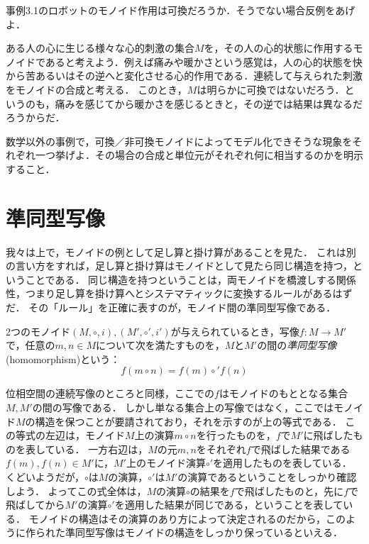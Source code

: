 \documentclass[11pt,a4paper]{jsarticle}
\begin{document}
\begin{exercise}
 事例3.1のロボットのモノイド作用は可換だろうか．そうでない場合反例をあげよ．
\end{exercise}


\begin{example}
    ある人の心に生じる様々な心的刺激の集合$M$を，その人の心的状態に作用するモノイドであると考えよう．例えば痛みや暖かさという感覚は，人の心的状態を快から苦あるいはその逆へと変化させる心的作用である．連続して与えられた刺激をモノイドの合成と考える．
    このとき，$M$は明らかに可換ではないだろう．というのも，痛みを感じてから暖かさを感じるときと，その逆では結果は異なるだろうからだ．
\end{example}

\begin{exercise}    数学以外の事例で，可換／非可換モノイドによってモデル化できそうな現象をそれぞれ一つ挙げよ．その場合の合成と単位元がそれぞれ何に相当するのかを明示すること．
\end{exercise}    


\section{準同型写像}
我々は上で，モノイドの例として足し算と掛け算があることを見た．
これは別の言い方をすれば，足し算と掛け算はモノイドとして見たら同じ構造を持つ，ということである．
同じ構造を持つということは，両モノイドを橋渡しする関係性，つまり足し算を掛け算へとシステマティックに変換するルールがあるはずだ．
その「ルール」を正確に表すのが，モノイド間の準同型写像である．

\begin{dfn}[準同型]
    2つのモノイド$(M, \circ, i), (M', \circ', i')$が与えられているとき，写像$f:M \to M'$で，任意の$m,n \in M$について次を満たすものを，$M$と$M'$の間の\emph{準同型写像}(homomorphism)という：
    \[f(m \circ n) = f(m) \circ' f(n)\]
\end{dfn}

位相空間の連続写像のところと同様，ここでの$f$はモノイドのもととなる集合$M,M'$の間の写像である．
しかし単なる集合上の写像ではなく，ここではモノイド$M$の構造を保つことが要請されており，それを示すのが上の等式である．
この等式の左辺は，モノイド$M$上の演算$m \circ n$を行ったものを，$f$で$M'$に飛ばしたものを表している．
一方右辺は，$M$の元$m,n$をそれぞれ$f$で飛ばした結果である$f(m), f(n) \in M'$に，$M'$上のモノイド演算$\circ'$を適用したものを表している．
くどいようだが，$\circ$は$M$の演算，$\circ'$は$M'$の演算であるということをしっかり確認しよう．
よってこの式全体は，$M$の演算$\circ$の結果を$f$で飛ばしたものと，先に$f$で飛ばしてから$M'$の演算$\circ'$を適用した結果が同じである，ということを表している．
モノイドの構造はその演算のあり方によって決定されるのだから，このように作られた準同型写像はモノイドの構造をしっかり保っているといえる．
\end{document}
